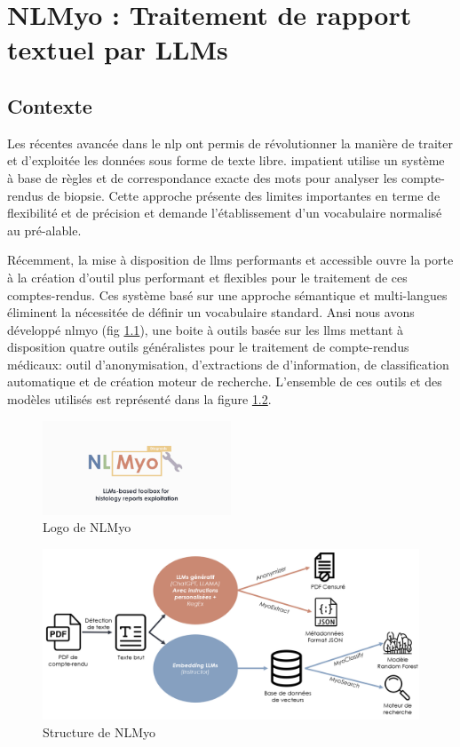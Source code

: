 \chapter{NLMyo : Traitement de rapport textuel par LLMs}

\section{Contexte}
Les récentes avancée dans le \gls{nlp} ont permis de révolutionner la manière de traiter et d'exploitée les données sous forme de texte libre. \gls{impatient} utilise un système à base de règles et de correspondance exacte des mots pour analyser les compte-rendus de biopsie. Cette approche présente des limites importantes en terme de flexibilité et de précision et demande l'établissement d'un vocabulaire normalisé au pré-alable. 

Récemment, la mise à disposition de \gls{llms} performants et accessible ouvre la porte à la création d'outil plus performant et flexibles pour le traitement de ces comptes-rendus. Ces système basé sur une approche sémantique et multi-langues éliminent la nécessitée de définir un vocabulaire standard. Ansi nous avons développé \gls{nlmyo} (fig \ref{fig:nlmyo_logo}), une boite à outils basée sur les \gls{llms} mettant à disposition quatre outils généralistes pour le traitement de compte-rendus médicaux: outil d'anonymisation, d'extractions de d'information, de classification automatique et de création moteur de recherche. L'ensemble de ces outils et des modèles utilisés est représenté dans la figure \ref{fig:nlmyo_struct}.
\begin{figure}[htbp]
  \centering
  \includegraphics[width=0.5\textwidth]{figures/nlmyo_banner.png}
  \caption[Logo NLMyo]{Logo de NLMyo}
  \label{fig:nlmyo_logo}
\end{figure}
\begin{figure}[htbp]
  \centering
  \includegraphics[width=1\textwidth]{figures/nlmyo_struct.png}
  \caption[Structure de NLMyo]{Structure de NLMyo}
  \label{fig:nlmyo_struct}
\end{figure}
